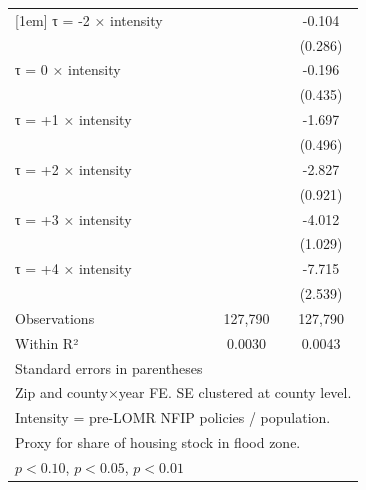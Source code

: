\begin{table}[htbp]
\begin{tabular}{l*{2}{c}}
[1em]
τ = -2 × intensity  &                     &      -0.104         \\
                    &                     &     (0.286)         \\
[1em]
τ = 0 × intensity   &                     &      -0.196         \\
                    &                     &     (0.435)         \\
[1em]
τ = +1 × intensity  &                     &      -1.697\sym{***}\\
                    &                     &     (0.496)         \\
[1em]
τ = +2 × intensity  &                     &      -2.827\sym{***}\\
                    &                     &     (0.921)         \\
[1em]
τ = +3 × intensity  &                     &      -4.012\sym{***}\\
                    &                     &     (1.029)         \\
[1em]
τ = +4 × intensity  &                     &      -7.715\sym{***}\\
                    &                     &     (2.539)         \\
\hline
Observations        &     127,790         &     127,790         \\
Within R²           &      0.0030         &      0.0043         \\
\hline\hline
\multicolumn{3}{l}{\footnotesize Standard errors in parentheses}\\
\multicolumn{3}{l}{\footnotesize Zip and county×year FE. SE clustered at county level.}\\
\multicolumn{3}{l}{\footnotesize Intensity = pre-LOMR NFIP policies / population.}\\
\multicolumn{3}{l}{\footnotesize Proxy for share of housing stock in flood zone.}\\
\multicolumn{3}{l}{\footnotesize \sym{*} \(p<0.10\), \sym{**} \(p<0.05\), \sym{***} \(p<0.01\)}\\
\end{tabular}
\end{table}
